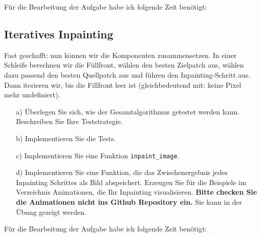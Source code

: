 Für die Bearbeitung der Aufgabe habe ich folgende Zeit benötigt:

\subsection{Iteratives Inpainting}

Fast geschafft: nun können wir die Komponenten zusammensetzen. In einer Schleife berechnen wir die Füllfront, wählen den besten Zielpatch aus, wählen dazu passend den besten Quellpatch aus und führen den Inpainting-Schritt aus. Dann iterieren wir, bis die Fillfront leer ist (gleichbedeutend mit: keine Pixel mehr undefiniert).

\begin{enumerate}

\item[a)] Überlegen Sie sich, wie der Gesamtalgorithmus getestet werden kann. Beschreiben Sie Ihre Teststrategie.

\item[b)] Implementieren Sie die Tests. 

\item[c)] Implementieren Sie eine Funktion \texttt{inpaint\_image}. 

\item[d)] Implementieren Sie eine Funktion, die das Zwischenergebnis jedes Inpainting Schrittes als Bild abspeichert. Erzeugen Sie für die Beispiele im Verzeichnis Animationen, die Ihr Inpainting visualisieren. \textbf{Bitte checken Sie die Animationen nicht ins Github Repository ein.} Sie kann in der Übung gezeigt werden.

\end{enumerate}

Für die Bearbeitung der Aufgabe habe ich folgende Zeit benötigt:

